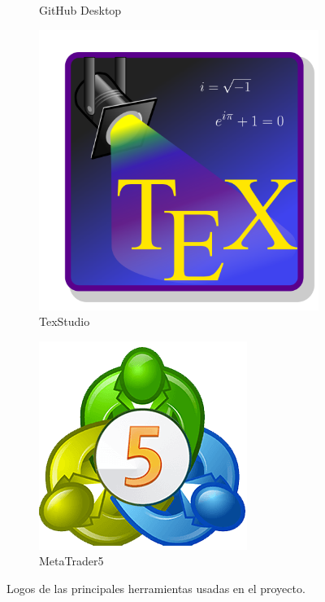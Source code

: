 \begin{figure}[!tbp]
\begin{subfigure}[b]{0.1\textwidth}
	\caption{GitHub Desktop}
\end{subfigure}
\hfill
\begin{subfigure}[b]{0.1\textwidth}
	\includegraphics[width=\textwidth, height=\textwidth]{imagenes/software_usado/icono_texstudio.png}
	\caption{TexStudio}
\end{subfigure}
\hfill
\begin{subfigure}[b]{0.1\textwidth}
	\includegraphics[width=\textwidth, height=\textwidth]{imagenes/software_usado/icono_metatrader5.png}
	\caption{MetaTrader5}
\end{subfigure}

	\caption{Logos de las principales herramientas usadas en el proyecto.}
\end{figure}

